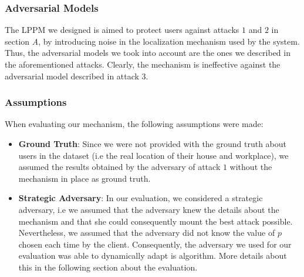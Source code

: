 \documentclass[10pt,conference,compsocconf]{IEEEtran}
\begin{document}
\subsubsection{Adversarial Models}
The LPPM we designed is aimed to protect users against attacks $1$ and $2$ in
section \textit{A}, by introducing noise in the localization mechanism used by
the system. Thus, the adversarial models we took into account are the ones we
described in the aforementioned attacks. Clearly, the mechanism is ineffective
against the adversarial model described in attack $3$.
\subsubsection{Assumptions}
When evaluating our mechanism, the following assumptions were made:
\begin{itemize}
    \item \textbf{Ground Truth}: Since we were not provided with the ground
    truth about users in the dataset (i.e the real location of their house and
    workplace), we assumed the results obtained by the adversary of attack $1$
    without the mechanism in place as ground truth.
    \item \textbf{Strategic Adversary}: In our evaluation, we considered a
    strategic adversary, i.e we assumed that the adversary knew the details
    about the mechanism and that she could consequently mount the best attack
    possible. Nevertheless, we assumed that the adversary did not know the value
    of $p$ chosen each time by the client.\newline
    Consequently, the adversary we used for our evaluation was able to
    dynamically adapt is algorithm. More details about this in the following
    section about the evaluation.
\end{itemize}
\end{document}
